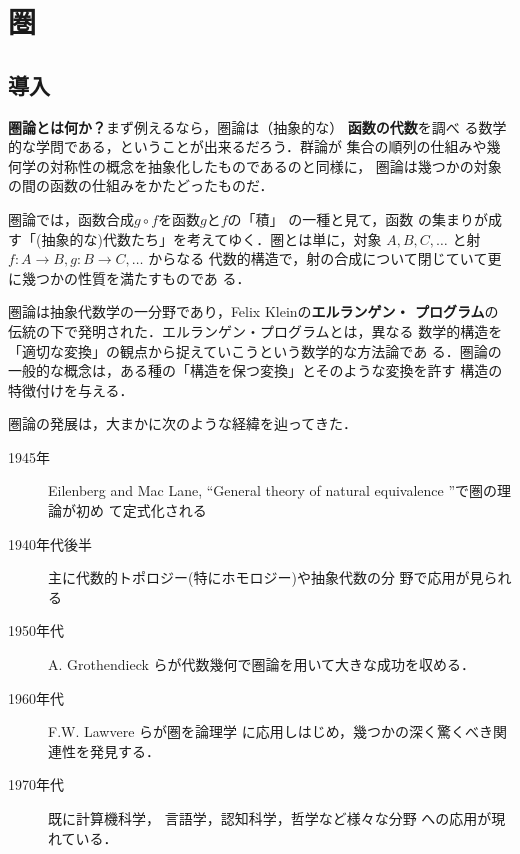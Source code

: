 \chapter{圏}\label{Categories}
\section{導入}
{\bfseries 圏論とは何か？}まず例えるなら，圏論は（抽象的な）
{\bfseries 函数の代数}を調べ
る数学的な学問である，ということが出来るだろう．群論が
集合の順列の仕組みや幾何学の対称性の概念を抽象化したものであるのと同様に，
圏論は幾つかの対象の間の函数の仕組みをかたどったものだ．

\begin{center}
\end{center}

圏論では，函数合成$g \circ f$を函数$g$と$f$の「積」 の一種と見て，函数
の集まりが成す「(抽象的な)代数たち」を考えてゆく．圏とは単に，対象 $A, B,
C,\ldots $ と射 $ f: A \rightarrow B, g: B \rightarrow C,\ldots$ からなる
代数的構造で，射の合成について閉じていて更に幾つかの性質を満たすものであ
る．

圏論は抽象代数学の一分野であり，Felix Kleinの{\bfseries エルランゲン・
プログラム}の伝統の下で発明された．エルランゲン・プログラムとは，異なる
数学的構造を「適切な変換」の観点から捉えていこうという数学的な方法論であ
る．圏論の一般的な概念は，ある種の「構造を保つ変換」とそのような変換を許す
構造の特徴付けを与える．

圏論の発展は，大まかに次のような経緯を辿ってきた．

\begin{description}
 \item[1945年] Eilenberg and Mac Lane,
	    ``General theory of natural equivalence ''で圏の理論が初め
	    て定式化される
 \item[1940年代後半] 主に代数的トポロジー(特にホモロジー)や抽象代数の分
	    野で応用が見られる
 \item[1950年代] A. Grothendieck 
	    らが代数幾何で圏論を用いて大きな成功を収める．
 \item[1960年代] F.W. Lawvere らが圏を論理学
	    に応用しはじめ，幾つかの深く驚くべき関連性を発見する．
 \item[1970年代] 既に計算機科学，
	    言語学，認知科学，哲学など様々な分野
	    への応用が現れている．
\end{description}

